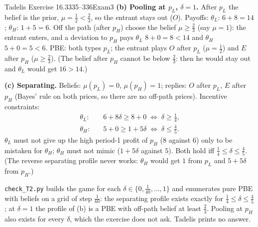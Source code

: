 \begin{exsol}{Tadelis Exercise 16.3}{335--336}{Exam}{3}
\textbf{(b) Pooling at $p_L$, $\delta = 1$.} After $p_L$ the belief is the prior, $\mu = \frac12 < \frac23$,
so the entrant stays out ($O$). Payoffs: $\theta_L$: $6 + 8 = 14$; $\theta_H$: $1 + 5 = 6$. Off the path
(after $p_H$) choose the belief $\mu \ge \frac23$ (say $\mu = 1$): the entrant enters, and a deviation
to $p_H$ pays $\theta_L$ $8 + 0 = 8 < 14$ and $\theta_H$ $5 + 0 = 5 < 6$. PBE: both types $p_L$; the
entrant plays $O$ after $p_L$ ($\mu = \frac12$) and $E$ after $p_H$ ($\mu \ge \frac23$). (The belief after
$p_H$ cannot be below $\frac23$: then he would stay out and $\theta_L$ would get $16 > 14$.)

\textbf{(c) Separating.} Beliefs: $\mu(p_L) = 0$, $\mu(p_H) = 1$; replies: $O$ after $p_L$, $E$ after $p_H$
(Bayes' rule on both prices, so there are no off-path prices). Incentive constraints:
\begin{align*}
  \theta_L:&\quad 6 + 8\delta \ge 8 + 0 \;\Longleftrightarrow\; \delta \ge \tfrac14, \\
  \theta_H:&\quad 5 + 0 \ge 1 + 5\delta \;\Longleftrightarrow\; \delta \le \tfrac45.
\end{align*}
$\theta_L$ must not give up the high period-1 profit of $p_H$ (8 against 6) only to be mistaken for
$\theta_H$; $\theta_H$ must not mimic ($1 + 5\delta$ against $5$). Both hold iff
$\frac14 \le \delta \le \frac45$. (The reverse separating profile never works: $\theta_H$
would get $1$ from $p_L$ and $5 + 5\delta$ from $p_H$.)

\verify \texttt{check\_T2.py} builds the game for each $\delta \in \{0, \frac1{40}, \dots, 1\}$ and
enumerates pure PBE with beliefs on a grid of step $\frac1{60}$: the separating profile exists
exactly for $\frac14 \le \delta \le \frac45$; at $\delta = 1$ the profile of (b) is a PBE with off-path
belief at least $\frac23$. Pooling at $p_H$ also exists for every $\delta$, which the exercise does not
ask. Tadelis prints no answer.

\end{exsol}
